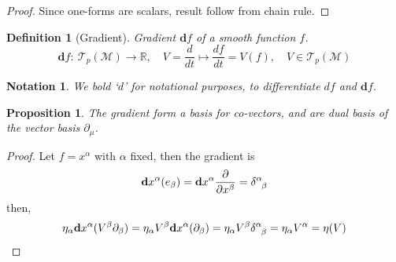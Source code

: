 \documentclass[a4paper]{article}
\newtheorem{notation}{Notation}[section]
\theoremstyle{new}
\newtheorem{defi}{Definition}[section]
\newtheorem{prop}{Proposition}[section]
\begin{document}
\begin{proof}
Since one-forms are scalars, result follow from chain rule.
\end{proof}
\begin{defi}[Gradient]
Gradient $\mathbf{d}f$ of a smooth function $f$.
$$\mathbf{d}f:~\mathcal{T}_p(\mathcal{M})\rightarrow\mathbb{R},\quad V=\frac{d}{dt}\mapsto\frac{df}{dt}=V(f),\quad V\in \mathcal{T}_p(\mathcal{M})$$
\end{defi}
\begin{notation}
We bold `$d$' for notational purposes, to differentiate $df$ and $\mathbf{d}f$.
\end{notation}
\begin{prop}
The gradient form a basis for co-vectors, and are dual basis of the vector basis $\partial_\mu$. 
\end{prop}
\begin{proof}
Let $f=x^\alpha$ with $\alpha$ fixed, then the gradient is
$$\mathbf{d}x^\alpha(e_\beta)=\mathbf{d}x^\alpha\frac{\partial}{\partial x^\beta}=\tensor*{\delta}{*_{}^{\alpha}_{\beta}}$$
then,
$$\eta_\alpha\mathbf{d}x^\alpha(V^\beta\partial_\beta)=\eta_\alpha V^\beta\mathbf{d}x^\alpha(\partial_\beta)=\eta_\alpha V^\beta\tensor*{\delta}{*_{}^{\alpha}_{\beta}}=\eta_\alpha V^\alpha=\eta(V)$$
\end{proof}
\end{document}
